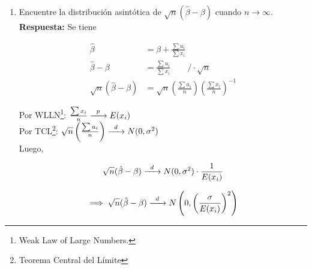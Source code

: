\documentclass{exam}
\begin{document}
\begin{enumerate}
    \item Encuentre la distribución asintótica de $\sqrt{n}(\hat{\beta} - \beta)$ cuando $n \longrightarrow \infty$.\\

    \textbf{Respuesta:} Se tiene

    \begin{align*}
        \hat{\beta} &= \beta + \frac{\sum u_i}{\sum x_i}\\
        \hat{\beta} - \beta &= \frac{\sum u_i}{\sum x_i} \qquad / \cdot \sqrt{n}\\
        \sqrt{n}(\hat{\beta} - \beta) &= \sqrt{n} \left(\frac{\sum u_i}{n} \right) \left(\frac{\sum x_i}{n} \right)^{-1}
    \end{align*}

    Por WLLN\footnote{Weak Law of Large Numbers.}: $\frac{\sum x_i}{n}  \xrightarrow{\enskip p\enskip} E(x_i)$\\
    Por TCL\footnote{Teorema Central del Límite}: $\sqrt{n} \left(\frac{\sum u_i}{n}\right) \xrightarrow{\enskip d\enskip} N(0,\sigma^2)$\\

    Luego,

    $$\sqrt{n}(\hat{\beta} - \beta) \xrightarrow{\enskip d\enskip} N(0,\sigma^2) \cdot \frac{1}{E(x_i)}$$

    $$\implies \sqrt{n}(\hat{\beta} - \beta) \xrightarrow{\enskip d\enskip} N\left(0,\left(\frac{\sigma}{E(x_i)}\right)^2\right)$$
    
\end{enumerate}
\end{document}
